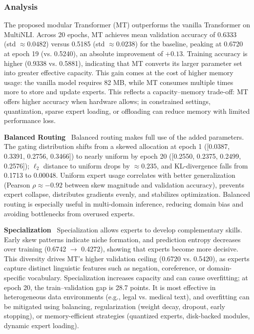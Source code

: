 \documentclass{article}
\begin{document}
\subsubsection{Analysis}
The proposed modular Transformer (MT) outperforms the vanilla Transformer on MultiNLI. Across 20 epochs, MT achieves mean validation accuracy of 0.6333 (std $\approx 0.0482$) versus 0.5185 (std $\approx 0.0238$) for the baseline, peaking at 0.6720 at epoch 19 (vs. 0.5240), an absolute improvement of $+0.13$. Training accuracy is higher (0.9338 vs. 0.5881), indicating that MT converts its larger parameter set into greater effective capacity. This gain comes at the cost of higher memory usage: the vanilla model requires 82 MB, while MT consumes multiple times more to store and update experts. This reflects a capacity–memory trade-off: MT offers higher accuracy when hardware allows; in constrained settings, quantization, sparse expert loading, or offloading can reduce memory with limited performance loss.

\vspace{2pt}
\noindent \textbf{Balanced Routing} \vspace{1pt} \
Balanced routing makes full use of the added parameters. The gating distribution shifts from a skewed allocation at epoch 1 ([0.0387, 0.3391, 0.2756, 0.3466]) to nearly uniform by epoch 20 ([0.2550, 0.2375, 0.2499, 0.2576]); $\ell_2$ distance to uniform drops by $\approx 0.235$, and KL-divergence falls from 0.1713 to 0.00048. Uniform expert usage correlates with better generalization (Pearson $\rho \approx -0.92$ between skew magnitude and validation accuracy), prevents expert collapse, distributes gradients evenly, and stabilizes optimization. Balanced routing is especially useful in multi-domain inference, reducing domain bias and avoiding bottlenecks from overused experts.

\vspace{1pt}
\noindent \textbf{Specialization} \vspace{1pt} \
Specialization allows experts to develop complementary skills. Early skew patterns indicate niche formation, and prediction entropy decreases over training (0.6742 $\rightarrow$ 0.4272), showing that experts become more decisive. This diversity drives MT’s higher validation ceiling (0.6720 vs. 0.5420), as experts capture distinct linguistic features such as negation, coreference, or domain-specific vocabulary. Specialization increases capacity and can cause overfitting; at epoch 20, the train–validation gap is 28.7 points. It is most effective in heterogeneous data environments (e.g., legal vs. medical text), and overfitting can be mitigated using balancing, regularization (weight decay, dropout, early stopping), or memory-efficient strategies (quantized experts, disk-backed modules, dynamic expert loading).
\end{document}
